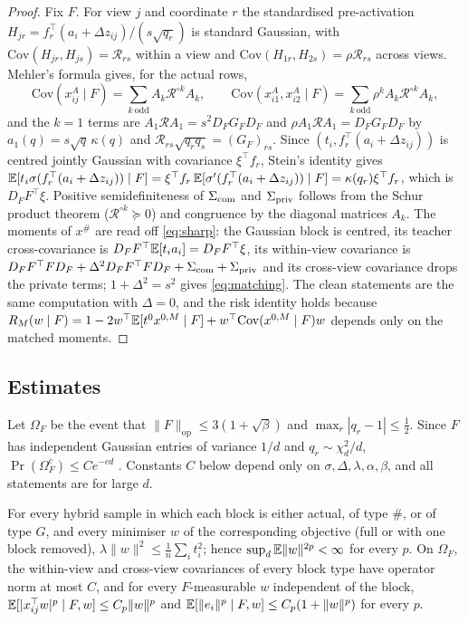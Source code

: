 \begin{proof}
Fix $F$. For view $j$ and coordinate $r$ the standardised pre-activation
$H_{jr}=f_r^\top(a_i+\Delta z_{ij})/(s\sqrt{q_r})$ is standard Gaussian, with
$\mathrm{Cov}(H_{jr},H_{js})=\mathscr R_{rs}$ within a view and $\mathrm{Cov}(H_{1r},H_{2s})=\rho\mathscr R_{rs}$
across views. Mehler's formula gives, for the actual rows,
\[
\mathrm{Cov}(x^A_{ij}\mid F)=\sum_{k\ \mathrm{odd}}A_k\mathscr R^{\circ k}A_k,\qquad
\mathrm{Cov}(x^A_{i1},x^A_{i2}\mid F)=\sum_{k\ \mathrm{odd}}\rho^kA_k\mathscr R^{\circ k}A_k ,
\]
and the $k=1$ terms are $A_1\mathscr RA_1=s^2D_FG_FD_F$ and $\rho A_1\mathscr RA_1=D_FG_FD_F$ by
$a_1(q)=s\sqrt q\,\kappa(q)$ and $\mathscr R_{rs}\sqrt{q_rq_s}=(G_F)_{rs}$. Since
$(t_i,f_r^\top(a_i+\Delta z_{ij}))$ is centred jointly Gaussian with covariance $\xi^\top f_r$, Stein's identity gives
$\mathbb{E}[t_i\sigma(f_r^\top(a_i+\Delta z_{ij}))\mid F]=\xi^\top f_r\,\mathbb{E}[\sigma'(f_r^\top(a_i+\Delta z_{ij}))\mid F]=\kappa(q_r)\xi^\top f_r$,
which is $D_FF^\top\xi$. Positive semidefiniteness of $\Sigma_{\rm com}$ and $\Sigma_{\rm priv}$ follows from the
Schur product theorem ($\mathscr R^{\circ k}\succeq0$) and congruence by the diagonal matrices $A_k$. The
moments of $x^\#$ are read off \eqref{eq:sharp}: the Gaussian block is centred, its teacher cross-covariance
is $D_FF^\top\mathbb{E}[t_ia_i]=D_FF^\top\xi$, its within-view covariance is
$D_FF^\top F D_F+\Delta^2D_FF^\top FD_F+\Sigma_{\rm com}+\Sigma_{\rm priv}$ and its cross-view covariance drops the
private terms; $1+\Delta^2=s^2$ gives \eqref{eq:matching}. The clean statements are the same computation
with $\Delta=0$, and the risk identity holds because $R_M(w\mid F)=1-2w^\top\mathbb{E}[t^0x^{0,M}\mid F]+w^\top\mathrm{Cov}(x^{0,M}\mid F)w$
depends only on the matched moments.
\end{proof}

\subsection{Estimates}

Let $\Omega_F$ be the event that $\|F\|_{\mathrm{op}}\le3(1+\sqrt\beta)$ and $\max_r|q_r-1|\le\frac12$. Since $F$
has independent Gaussian entries of variance $1/d$ and $q_r\sim\chi^2_d/d$, $\Pr(\Omega_F^c)\le Ce^{-cd}$
\cite[Theorem~4.4.5 and Section~2.8]{Vershynin}. Constants $C$ below depend only on
$\sigma,\Delta,\lambda,\alpha,\beta$, and all statements are for large $d$.

\begin{lemma}\label{lem:apriori}
For every hybrid sample in which each block is either actual, of type $\#$, or of type $G$, and every
minimiser $w$ of the corresponding objective (full or with one block removed),
$\lambda\|w\|^2\le\frac1n\sum_it_i^2$; hence $\sup_d\mathbb{E}\|w\|^{2p}<\infty$ for every $p$. On $\Omega_F$, the
within-view and cross-view covariances of every block type have operator norm at most $C$, and for every
$F$-measurable $w$ independent of the block, $\mathbb{E}[|x_{ij}^\top w|^{p}\mid F,w]\le C_p\|w\|^p$ and
$\mathbb{E}[\|e_i\|^p\mid F,w]\le C_p(1+\|w\|^p)$ for every $p$.
\end{lemma}

